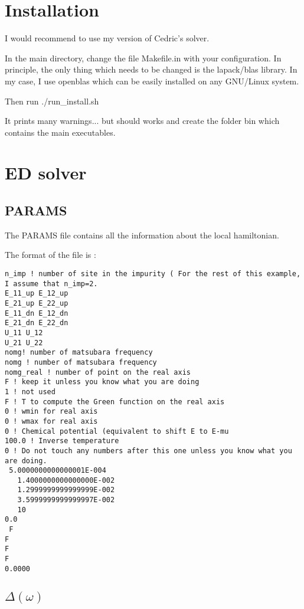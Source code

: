 \documentclass{book}
\def\D{\Delta}
\def\w{\omega}
\begin{document}
\section{Installation}

I would recommend to use my version of Cedric's solver.

In the main directory, change the file Makefile.in with your configuration. In principle, the only thing which needs to be changed is the lapack/blas library. In my case, I use openblas which can be easily installed on any GNU/Linux system.

Then run ./run\_install.sh

It prints many warnings... but should works and create the folder bin which contains the main executables.


\section{ED solver}

\subsection{PARAMS}

The PARAMS file contains all the information about the  local hamiltonian.

The format of the file is  :

\begin{lstlisting}
n_imp ! number of site in the impurity ( For the rest of this example, I assume that n_imp=2.
E_11_up E_12_up
E_21_up E_22_up
E_11_dn E_12_dn
E_21_dn E_22_dn
U_11 U_12
U_21 U_22
nomg! number of matsubara frequency
nomg ! number of matsubara frequency
nomg_real ! number of point on the real axis
F ! keep it unless you know what you are doing
1 ! not used
F ! T to compute the Green function on the real axis
0 ! wmin for real axis
0 ! wmax for real axis
0 ! Chemical potential (equivalent to shift E to E-mu
100.0 ! Inverse temperature
0 ! Do not touch any numbers after this one unless you know what you are doing.
 5.0000000000000001E-004
   1.4000000000000000E-002
   1.2999999999999999E-002
   3.5999999999999997E-002
   10
0.0
 F
F
F
F
0.0000
\end{lstlisting}



\subsection{$\D(\w)$}
\end{document}
